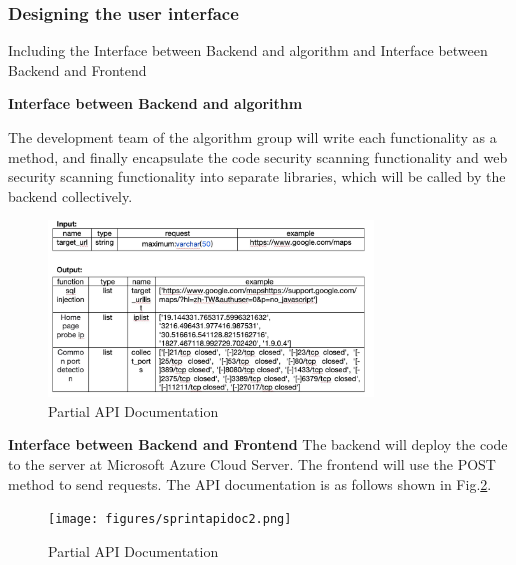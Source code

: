\documentclass[journal]{IEEEtran}
\begin{document}
\subsubsection{Designing the user interface} Including the Interface between Backend and algorithm and Interface between Backend and Frontend

\textbf{Interface between Backend and algorithm}

The development team of the algorithm group will write each functionality as a method, and finally encapsulate the code security scanning functionality and web security scanning functionality into separate libraries, which will be called by the backend collectively.

\begin{figure}[h]
  \centering
  \includegraphics[width=3.4in]{figures/sprintapidoc1.png}
  \caption{Partial API Documentation}
  \label{fig:sprintapidoc1}
  \end{figure}

\textbf{Interface between Backend and Frontend}
The backend will deploy the code to the server at Microsoft Azure Cloud Server. The frontend will use the POST method to send requests. The API documentation is as follows shown in Fig.\ref{fig:sprintapidoc2}.
\begin{figure}[h]
  \centering
  \texttt{[image: figures/sprintapidoc2.png]}
  \caption{Partial API Documentation}
  \label{fig:sprintapidoc2}
  \end{figure}
\end{document}
